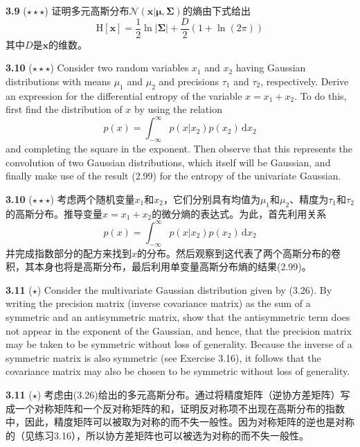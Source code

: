 \documentclass{article}
\begin{document}
\textbf{3.9} ($\star\star\star$) 证明多元高斯分布$\mathcal{N}(\mathbf{x}|\boldsymbol{\mu}, \boldsymbol{\Sigma})$的熵由下式给出
\begin{equation}
\mathrm{H}[\mathbf{x}] = \frac{1}{2} \ln |\boldsymbol{\Sigma}| + \frac{D}{2} (1 + \ln(2\pi)) \tag{3.204}
\end{equation}
其中$D$是$\mathbf{x}$的维数。

\textbf{3.10} ($\star\star\star$) Consider two random variables $x_1$ and $x_2$ having Gaussian distributions with means $\mu_1$ and $\mu_2$ and precisions $\tau_1$ and $\tau_2$, respectively. Derive an expression for the differential entropy of the variable $x = x_1 + x_2$. To do this, first find the distribution of $x$ by using the relation
\begin{equation}
p(x) = \int_{-\infty}^{\infty} p(x|x_2)p(x_2) \,\mathrm{d}x_2 \tag{3.205}
\end{equation}
and completing the square in the exponent. Then observe that this represents the convolution of two Gaussian distributions, which itself will be Gaussian, and finally make use of the result (2.99) for the entropy of the univariate Gaussian.

\textbf{3.10} ($\star\star\star$) 考虑两个随机变量$x_1$和$x_2$，它们分别具有均值为$\mu_1$和$\mu_2$、精度为$\tau_1$和$\tau_2$的高斯分布。推导变量$x = x_1 + x_2$的微分熵的表达式。为此，首先利用关系
\begin{equation}
p(x) = \int_{-\infty}^{\infty} p(x|x_2)p(x_2) \,\mathrm{d}x_2 \tag{3.205}
\end{equation}
并完成指数部分的配方来找到$x$的分布。然后观察到这代表了两个高斯分布的卷积，其本身也将是高斯分布，最后利用单变量高斯分布熵的结果(2.99)。

\textbf{3.11} ($\star$) Consider the multivariate Gaussian distribution given by (3.26). By writing the precision matrix (inverse covariance matrix) as the sum of a symmetric and an antisymmetric matrix, show that the antisymmetric term does not appear in the exponent of the Gaussian, and hence, that the precision matrix may be taken to be symmetric without loss of generality. Because the inverse of a symmetric matrix is also symmetric (see Exercise 3.16), it follows that the covariance matrix may also be chosen to be symmetric without loss of generality.

\textbf{3.11} ($\star$) 考虑由(3.26)给出的多元高斯分布。通过将精度矩阵（逆协方差矩阵）写成一个对称矩阵和一个反对称矩阵的和，证明反对称项不出现在高斯分布的指数中，因此，精度矩阵可以被取为对称的而不失一般性。因为对称矩阵的逆也是对称的（见练习3.16），所以协方差矩阵也可以被选为对称的而不失一般性。
\end{document}

